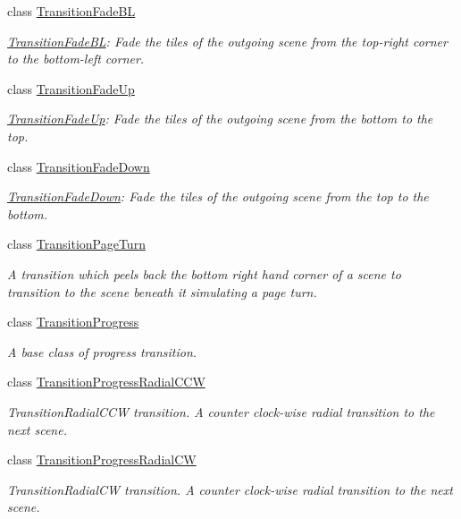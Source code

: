 \begin{DoxyCompactItemize}
class \hyperlink{classTransitionFadeBL}{Transition\+Fade\+BL}
\begin{DoxyCompactList}\small\item\em \hyperlink{classTransitionFadeBL}{Transition\+Fade\+BL}\+: Fade the tiles of the outgoing scene from the top-\/right corner to the bottom-\/left corner. \end{DoxyCompactList}\item 
class \hyperlink{classTransitionFadeUp}{Transition\+Fade\+Up}
\begin{DoxyCompactList}\small\item\em \hyperlink{classTransitionFadeUp}{Transition\+Fade\+Up}\+: Fade the tiles of the outgoing scene from the bottom to the top. \end{DoxyCompactList}\item 
class \hyperlink{classTransitionFadeDown}{Transition\+Fade\+Down}
\begin{DoxyCompactList}\small\item\em \hyperlink{classTransitionFadeDown}{Transition\+Fade\+Down}\+: Fade the tiles of the outgoing scene from the top to the bottom. \end{DoxyCompactList}\item 
class \hyperlink{classTransitionPageTurn}{Transition\+Page\+Turn}
\begin{DoxyCompactList}\small\item\em A transition which peels back the bottom right hand corner of a scene to transition to the scene beneath it simulating a page turn. \end{DoxyCompactList}\item 
class \hyperlink{classTransitionProgress}{Transition\+Progress}
\begin{DoxyCompactList}\small\item\em A base class of progress transition. \end{DoxyCompactList}\item 
class \hyperlink{classTransitionProgressRadialCCW}{Transition\+Progress\+Radial\+C\+CW}
\begin{DoxyCompactList}\small\item\em Transition\+Radial\+C\+CW transition. A counter clock-\/wise radial transition to the next scene. \end{DoxyCompactList}\item 
class \hyperlink{classTransitionProgressRadialCW}{Transition\+Progress\+Radial\+CW}
\begin{DoxyCompactList}\small\item\em Transition\+Radial\+CW transition. A counter clock-\/wise radial transition to the next scene. \end{DoxyCompactList}\item 

\end{DoxyCompactItemize}
